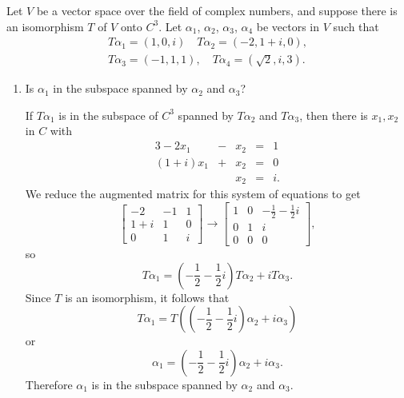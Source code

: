  Let $V$ be a vector space over the field of complex
numbers, and suppose there is an isomorphism $T$ of $V$ onto
$C^3$. Let $\alpha_1$, $\alpha_2$, $\alpha_3$, $\alpha_4$ be vectors
in $V$ such that
\begin{align*}
  T\alpha_1 = (1, 0, i) \quad T\alpha_2 = (-2, 1 + i, 0), \\
  T\alpha_3 = (-1, 1, 1), \quad T\alpha_4 = (\sqrt2, i, 3).
\end{align*}
\begin{enumerate}
\item Is $\alpha_1$ in the subspace spanned by $\alpha_2$ and
  $\alpha_3$?
  \begin{solution}
    If $T\alpha_1$ is in the subspace of $C^3$ spanned by $T\alpha_2$
    and $T\alpha_3$, then there is $x_1,x_2$ in $C$ with
    \begin{alignat*}{3}
      -2x_1 &{}-{}& x_2 &{}={}& 1 \\
      (1 + i)x_1 &{}+{}& x_2 &{}={}& 0 \\
      && x_2 &{}={}& i.
    \end{alignat*}
    We reduce the augmented matrix for this system of equations to get
    \begin{equation*}
      \begin{bmatrix}
        -2 & -1 & 1 \\
        1 + i & 1 & 0 \\
        0 & 1 & i
      \end{bmatrix}
      \rightarrow
      \begin{bmatrix}
        1 & 0 & -\frac12 - \frac12i \\[3pt]
        0 & 1 & i \\[3pt]
        0 & 0 & 0
      \end{bmatrix},
    \end{equation*}
    so
    \begin{equation*}
      T\alpha_1 = \left(-\frac12 - \frac12i\right)T\alpha_2 + iT\alpha_3.
    \end{equation*}
    Since $T$ is an isomorphism, it follows that
    \begin{equation*}
      T\alpha_1
      = T\left(\left(-\frac12 - \frac12i\right)\alpha_2 + i\alpha_3\right)
    \end{equation*}
    or
    \begin{equation*}
      \alpha_1 = \left(-\frac12 - \frac12i\right)\alpha_2 + i\alpha_3.
    \end{equation*}
    Therefore $\alpha_1$ is in the subspace spanned by $\alpha_2$ and
    $\alpha_3$.
  \end{solution}


\end{enumerate}

